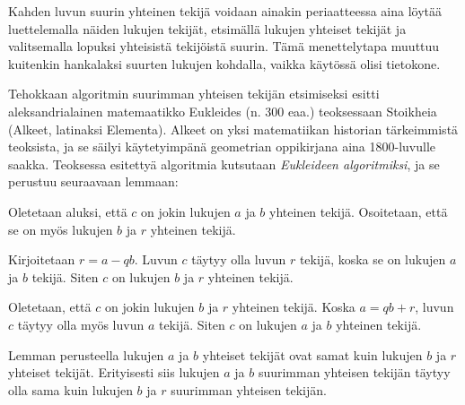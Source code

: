Kahden luvun suurin yhteinen tekijä voidaan ainakin periaatteessa aina löytää luettelemalla näiden lukujen tekijät, etsimällä lukujen yhteiset tekijät ja valitsemalla lopuksi yhteisistä tekijöistä suurin. Tämä menettelytapa muuttuu kuitenkin hankalaksi suurten lukujen kohdalla, vaikka käytössä olisi tietokone.

Tehokkaan algoritmin suurimman yhteisen tekijän etsimiseksi esitti aleksandrialainen matemaatikko Eukleides (n. 300 eaa.) teoksessaan Stoikheia (Alkeet, latinaksi Elementa). Alkeet on yksi matematiikan historian tärkeimmistä teoksista, ja se säilyi käytetyimpänä geometrian oppikirjana aina 1800-luvulle saakka. Teoksessa esitettyä algoritmia kutsutaan {\em Eukleideen algoritmiksi}, ja se perustuu seuraavaan lemmaan:



\begin{todistus}
Oletetaan aluksi, että $c$ on jokin lukujen $a$ ja $b$ yhteinen tekijä. Osoitetaan, että se on myös lukujen $b$ ja $r$ yhteinen tekijä.

Kirjoitetaan $r=a-qb$. Luvun $c$ täytyy olla luvun $r$ tekijä, koska se on lukujen $a$ ja $b$ tekijä. Siten $c$ on lukujen $b$ ja $r$ yhteinen tekijä.

Oletetaan, että $c$ on jokin lukujen $b$ ja $r$ yhteinen tekijä. Koska $a=qb+r$, luvun $c$ täytyy olla myös luvun $a$ tekijä. Siten $c$ on lukujen $a$ ja $b$ yhteinen tekijä.

\end{todistus}


\begin{todistus}
Lemman perusteella lukujen $a$ ja $b$ yhteiset tekijät ovat samat kuin lukujen $b$ ja $r$ yhteiset tekijät. Erityisesti siis lukujen $a$ ja $b$ suurimman yhteisen tekijän täytyy olla sama kuin lukujen $b$ ja $r$ suurimman yhteisen tekijän.
\end{todistus}

